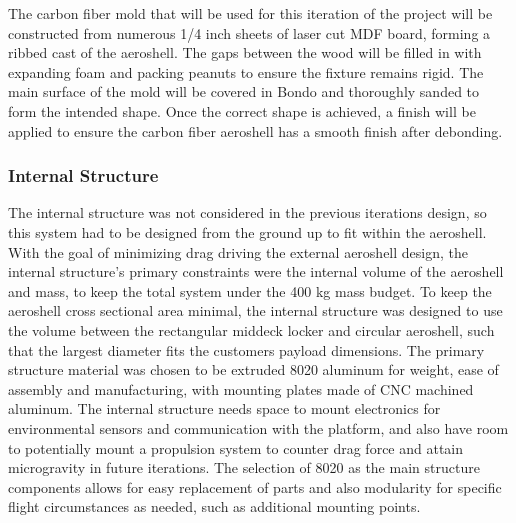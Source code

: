 The carbon fiber mold that will be used for this iteration of the project will be constructed from numerous 1/4 inch sheets of laser cut MDF board, forming a ribbed cast of the aeroshell. The gaps between the wood will be filled in with expanding foam and packing peanuts to ensure the fixture remains rigid. The main surface of the mold will be covered in Bondo and thoroughly sanded to form the intended shape. Once the correct shape is achieved, a finish will be applied to ensure the carbon fiber aeroshell has a smooth finish after debonding.

\subsubsection{Internal Structure}

\indent\indent The internal structure was not considered in the previous iterations design, so this system had to be designed from the ground up to fit within the aeroshell. With the goal of minimizing drag driving the external aeroshell design, the internal structure's primary constraints were the internal volume of the aeroshell and mass, to keep the total system under the 400 kg mass budget. To keep the aeroshell cross sectional area minimal, the internal structure was designed to use the volume between the rectangular middeck locker and circular aeroshell, such that the largest diameter fits the customers payload dimensions. The primary structure material was chosen to be extruded 8020 aluminum for weight, ease of assembly and manufacturing, with mounting plates made of CNC machined aluminum. The internal structure needs space to mount electronics for environmental sensors and communication with the platform, and also have room to potentially mount a propulsion system to counter drag force and attain microgravity in future iterations. The selection of 8020 as the main structure components allows for easy replacement of parts and also modularity for specific flight circumstances as needed, such as additional mounting points.

